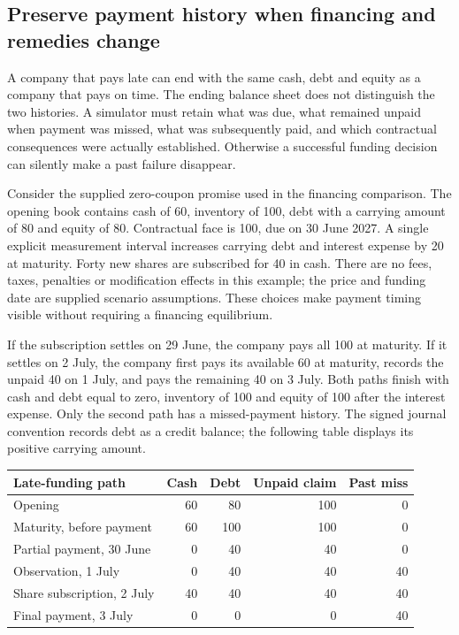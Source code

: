 \subsection{Preserve payment history when financing and remedies change}
\label{sec:selected-financing-history}

A company that pays late can end with the same cash, debt and equity as a
company that pays on time. The ending balance sheet does not distinguish the
two histories. A simulator must retain what was due, what remained unpaid
when payment was missed, what was subsequently paid, and which contractual
consequences were actually established. Otherwise a successful funding decision
can silently make a past failure disappear.

Consider the supplied zero-coupon promise used in the financing comparison.
The opening book contains cash of 60, inventory of 100, debt with a carrying
amount of 80 and equity of 80. Contractual face is 100, due on 30 June 2027.
A single explicit measurement interval increases carrying debt and interest
expense by 20 at maturity. Forty new shares are subscribed for 40 in cash.
There are no fees, taxes, penalties or modification effects in this example;
the price and funding date are supplied scenario assumptions. These choices
make payment timing visible without requiring a financing equilibrium.

If the subscription settles on 29 June, the company pays all 100 at maturity.
If it settles on 2 July, the company first pays its available 60 at maturity,
records the unpaid 40 on 1 July, and pays the remaining 40 on 3 July. Both
paths finish with cash and debt equal to zero, inventory of 100 and equity of
100 after the interest expense. Only the second path has a missed-payment
history. The signed journal convention records debt as a credit balance;
the following table displays its positive carrying amount.

\begin{center}
\begin{tabular}{lrrrr}
\toprule
Late-funding path & Cash & Debt & Unpaid claim & Past miss \\
\midrule
Opening & 60 & 80 & 100 & 0 \\
Maturity, before payment & 60 & 100 & 100 & 0 \\
Partial payment, 30 June & 0 & 40 & 40 & 0 \\
Observation, 1 July & 0 & 40 & 40 & 40 \\
Share subscription, 2 July & 40 & 40 & 40 & 40 \\
Final payment, 3 July & 0 & 0 & 0 & 40 \\
\bottomrule
\end{tabular}
\end{center}

